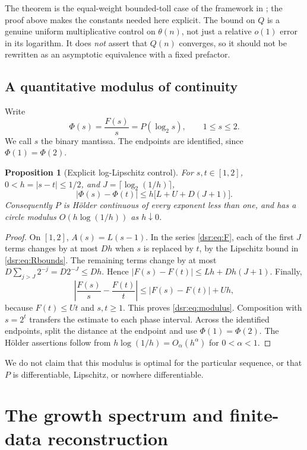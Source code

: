 \documentclass[11pt,a4paper]{article}
\numberwithin{equation}{section}
\newtheorem{proposition}[theorem]{Proposition}
\theoremstyle{definition}
\theoremstyle{remark}
\theoremstyle{definition}
\theoremstyle{plain}
\begin{document}
The theorem is the equal-weight bounded-toll case of the framework in
\cite{HJT}; the proof above makes the constants needed here explicit. The
bound on $Q$ is a genuine uniform multiplicative control on $\theta(n)$,
not just a relative $o(1)$ error in its logarithm. It does \emph{not} assert
that $Q(n)$ converges, so it should not be rewritten as an asymptotic
equivalence with a fixed prefactor.

\subsection{A quantitative modulus of continuity}
Write
\begin{equation}
 \Phi(s)=\frac{F(s)}s=P(\log_2s),\qquad 1\le s\le2.
\end{equation}
We call $s$ the binary mantissa. The endpoints are identified, since
$\Phi(1)=\Phi(2)$.

\begin{proposition}[Explicit log-Lipschitz control]
\label{dsr:prop:modulus}
For $s,t\in[1,2]$, $0<h=|s-t|\le1/2$, and
$J=\lceil\log_2(1/h)\rceil$,
\begin{equation}
 |\Phi(s)-\Phi(t)|
 \le h\bigl[L+U+D(J+1)\bigr].
\label{dsr:eq:modulus}
\end{equation}
Consequently $P$ is H\"older continuous of every exponent less than one, and
has a circle modulus $O(h\log(1/h))$ as $h\downarrow0$.
\end{proposition}
\begin{proof}
On $[1,2]$, $A(s)=L(s-1)$. In the series \eqref{dsr:eq:F}, each of the first $J$
terms changes by at most $Dh$ when $s$ is replaced by $t$, by the Lipschitz
bound in \eqref{dsr:eq:Rbounds}. The remaining terms change by at most
$D\sum_{j>J}2^{-j}=D2^{-J}\le Dh$. Hence
$|F(s)-F(t)|\le Lh+Dh(J+1)$. Finally,
\[
 \left|\frac{F(s)}s-\frac{F(t)}t\right|
 \le |F(s)-F(t)|+Uh,
\]
because $F(t)\le Ut$ and $s,t\ge1$. This proves \eqref{dsr:eq:modulus}.
Composition with $s=2^t$ transfers the estimate to each phase interval.
Across the identified endpoints, split the distance at the endpoint and use
$\Phi(1)=\Phi(2)$. The H\"older assertions follow from
$h\log(1/h)=O_\alpha(h^\alpha)$ for $0<\alpha<1$.
\end{proof}
We do not claim that this modulus is optimal for the particular sequence, or
that $P$ is differentiable, Lipschitz, or nowhere differentiable.

\section{The growth spectrum and finite-data reconstruction}
\label{dsr:sec:reconstruction}
\end{document}
